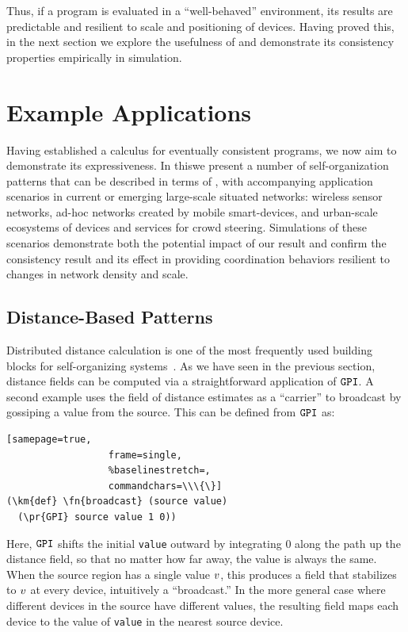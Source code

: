 \documentclass[12pt,a4paper,twoside,openright]{book}
\begin{document}
Thus, if a program is evaluated in a ``well-behaved'' environment, its results are predictable and resilient to scale and positioning of devices.
%
Having proved this, in the next section we explore the usefulness of \calculus{} and demonstrate its consistency properties empirically in simulation.

\section{Example Applications}

Having established a calculus for eventually consistent programs, we now aim to demonstrate its expressiveness.
%
In this\levelText{}we present a number of self-organization patterns that can be described in terms of \calculus{}, with accompanying application scenarios in current or emerging large-scale situated networks: wireless sensor networks, ad-hoc networks created by mobile smart-devices, and urban-scale ecosystems of devices and services for crowd steering.
%
Simulations of these scenarios demonstrate both the potential impact of our result and confirm the consistency result and its effect in providing coordination behaviors resilient to changes in network density and scale.

\subsection{Distance-Based Patterns}

Distributed distance calculation is one of the most frequently used building blocks for self-organizing systems~\cite{FDMVA-NACO2012}.
%
As we have seen in the previous section, distance fields can be computed via a straightforward application of $\texttt{GPI}$.
%
A second example uses the field of distance estimates as a ``carrier'' to broadcast by gossiping a value from the source.  This can be defined from $\texttt{GPI}$ as:
\begin{Verbatim}[samepage=true,
                  frame=single,
                  %baselinestretch=,
                  commandchars=\\\{\}]
(\km{def} \fn{broadcast} (source value)
  (\pr{GPI} source value 1 0))
\end{Verbatim}
Here, $\texttt{GPI}$ shifts the initial {\tt value} outward by integrating $0$ along the path up the distance field, so that no matter how far away, the value is always the same.
%
When the source region has a single value $v$, this produces a field that stabilizes to $v$ at every device, intuitively a ``broadcast.''
%
In the more general case where different devices in the source have different values, the resulting field maps each device to the value of \texttt{value} in the nearest source device.
\end{document}
